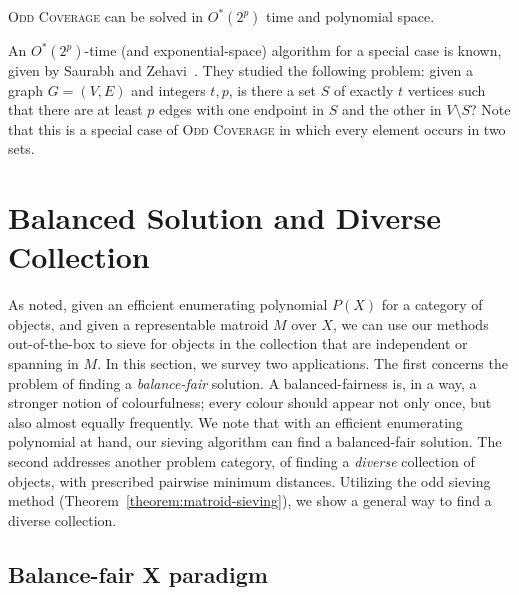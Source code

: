 \documentclass{theoretics}
\begin{document}
\begin{theorem}
  \textsc{Odd Coverage} can be solved in $O^*(2^p)$ time and polynomial space.
\end{theorem}

An $O^*(2^p)$-time (and exponential-space) algorithm for a special case is known, given by Saurabh and Zehavi~\cite{SaurabhZ18}.
They studied the following problem: given a graph $G = (V, E)$ and integers $t, p$, is there a set $S$ of exactly $t$ vertices such that there are at least $p$ edges with one endpoint in $S$ and the other in $V \setminus S$?
Note that this is a special case of \textsc{Odd Coverage} in which every element occurs in two sets.

\section{Balanced Solution and Diverse Collection}

As noted, given an efficient enumerating polynomial $P(X)$ for a
category of objects, and given a representable matroid $M$ over $X$,
we can use our methods out-of-the-box to sieve for objects in the
collection that are independent or spanning in $M$.
In this section, we survey two applications.
The first concerns the problem of finding a \emph{balance-fair} solution.
A balanced-fairness is, in a way, a stronger notion of colourfulness; every colour should appear not only once, but also almost equally frequently.
We note that with an efficient enumerating polynomial at hand, our sieving algorithm can find a balanced-fair solution. 
The second addresses another problem category, of finding a \emph{diverse}
collection of objects, with prescribed pairwise minimum distances.
Utilizing the odd sieving method (Theorem~\ref{theorem:matroid-sieving}), we show a general way to find a diverse collection.

\subsection{Balance-fair X paradigm}
\label{sec:balanced}
\end{document}
